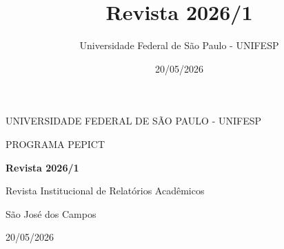 \documentclass[12pt,openright,oneside,a4paper]{report}
\title{Revista 2026/1}
\author{Universidade Federal de São Paulo - UNIFESP}
\date{20/05/2026}
\begin{document}

\begin{titlepage}

    \centering

    \vspace*{2cm}

    {\Large UNIVERSIDADE FEDERAL DE SÃO PAULO - UNIFESP \par}

    \vspace{0.5cm}

    {\large PROGRAMA PEPICT \par}

    \vfill

    {\bfseries\LARGE Revista 2026/1 \par}

    \vspace{1cm}

    {\large Revista Institucional de Relatórios Acadêmicos \par}

    \vfill

    {\large São José dos Campos\par}

    {\large 20/05/2026 \par}

\end{titlepage}

\end{document}
